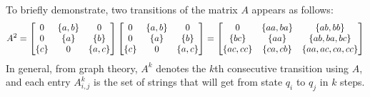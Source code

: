 \begin{example}
  To briefly demonstrate, two transitions of the matrix \(A\) appears as
  follows:
  \begin{align*}
    A^2 =
      \begin{bmatrix}
        0 & \left\{a, b\right\} & 0 \\
        0 & \left\{a\right\} & \left\{b\right\} \\
        \left\{c\right\} & 0 & \left\{a, c\right\}
      \end{bmatrix} 
      \begin{bmatrix}
        0 & \left\{a, b\right\} & 0 \\
        0 & \left\{a\right\} & \left\{b\right\} \\
        \left\{c\right\} & 0 & \left\{a, c\right\}
      \end{bmatrix}
      =
      \begin{bmatrix}
        0 & \left\{aa, ba\right\} & \left\{ab, bb\right\} \\
        \left\{bc\right\} & \left\{aa\right\} & \left\{ab, ba, bc\right\} \\
        \left\{ac, cc\right\} & \left\{ca, cb\right\} & \left\{aa, ac, ca, cc\right\}
      \end{bmatrix}
  \end{align*}
  In general, from graph theory, \(A^k\) denotes the \(k\)th consecutive
  transition using \(A\),
  and each entry \(A^k _{i, j}\) is the set of strings that will
  get from state \(q_i\) to \(q_j\) in \(k\) steps.

\end{example}

